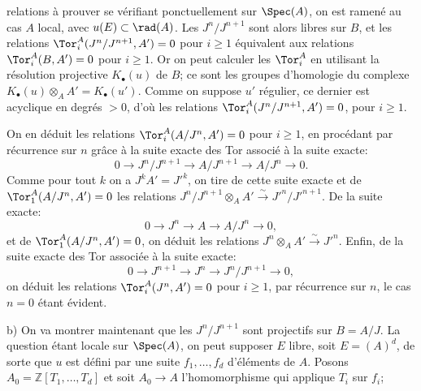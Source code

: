 relations à prouver se vérifiant ponctuellement sur $\Spec(A)$, on est ramené au cas $A$ local, avec $u(E)\subset\rad(A)$. Les $J^n/J^{n+1}$ sont alors libres sur $B$, et les relations $\Tor_i^A(J^n/J^{n+1},A')=0$ pour $i\geq1$ équivalent aux relations $\Tor_i^A(B,A')=0$ pour $i\geq1$. Or on peut calculer les $\Tor_i^A$ en utilisant la résolution projective $K_\bullet(u)$ de $B$; ce sont les groupes d'homologie du complexe $K_\bullet(u)\otimes_AA'=K_\bullet(u')$. Comme on suppose $u'$ régulier, ce dernier est acyclique en degrés $>0$, d'où les relations $\Tor_i^A(J^n/J^{n+1},A')=0$, pour $i\geq1$.

On en déduit les relations $\Tor_i^A(A/J^n,A')=0$ pour $i\geq1$, en procédant par récurrence sur $n$ grâce à la suite exacte des Tor associé à la suite exacte:
\[
 0\longrightarrow J^n/J^{n+1}\longrightarrow A/J^{n+1}\longrightarrow A/J^n\longrightarrow0.
\]
Comme pour tout $k$ on a $J^kA'=J'^k$, on tire de cette suite exacte et de $\Tor_1^A(A/J^n,A')=0$ les relations $J^n/J^{n+1}\otimes_AA'\xrightarrow{\sim}J'^n/J'^{n+1}$. De la suite exacte:
\[
 0\longrightarrow J^n\longrightarrow A\longrightarrow A/J^n\longrightarrow0,
\]
et de $\Tor_1^A(A/J^n,A')=0$, on déduit les relations $J^n\otimes_AA'\xrightarrow{\sim}J'^n$. Enfin, de la suite exacte des Tor associée à la suite exacte:
\[
 0\longrightarrow J^{n+1}\longrightarrow J^n\longrightarrow J^n/J^{n+1}\longrightarrow0,
\]
on déduit les relations $\Tor_i^A(J^n,A')=0$ pour $i\geq1$, par récurrence sur $n$, le cas $n=0$ étant évident.

b) On va montrer maintenant que les $J^n/J^{n+1}$ sont projectifs sur $B=A/J$. La question étant locale sur $\Spec(A)$, on peut supposer $E$ libre, soit $E=(A)^d$, de sorte que $u$ est défini par une suite $f_1,\ldots,f_d$ d'éléments de $A$. Posons $A_0=\mathbb Z[T_1,\ldots,T_d]$ et soit $A_0\longrightarrow A$ l'homomorphisme qui applique $T_i$ sur $f_i$;
